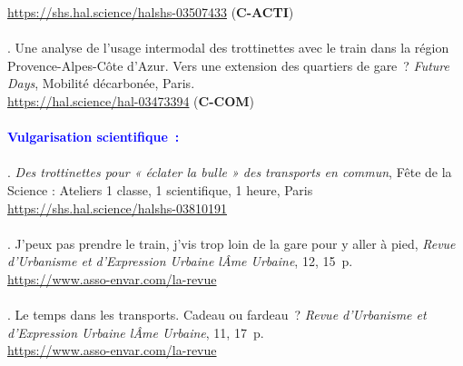 \begin{refsegment}
\begin{tcolorbox}[colback=white!5!white,
                      colframe=blue!75!blue,
                      title=Valorisation scientifique
                      \\
                      Chapitre~5]
{\footnotesize{\url{https://shs.hal.science/halshs-03507433}} (\textbf{C-ACTI})}
    \\\\
\small{\textcolor{blue}{\textcite{moinse_analyse_2021}}. Une analyse de l’usage intermodal des trottinettes avec le train dans la région Provence-Alpes-Côte d’Azur. Vers une extension des quartiers de gare~? \textsl{Future Days}, Mobilité décarbonée, Paris.
\\
\footnotesize{\url{https://hal.science/hal-03473394}} (\textbf{C-COM})}
    \\\\
\Large{\textcolor{blue}{\textbf{Vulgarisation scientifique~:}}}
    \\\\
\small{\textcolor{blue}{\textcite{moinse_trottinettes_2022}}. \textsl{Des trottinettes pour « éclater la bulle » des transports en commun}, Fête de la Science : Ateliers 1 classe, 1 scientifique, 1 heure, Paris 
\\
\footnotesize{\url{https://shs.hal.science/halshs-03810191}}}
    \\\\
\small{\textcolor{blue}{\textcite{moinse_jpeux_2022}}. J’peux pas prendre le train, j’vis trop loin de la gare pour y aller à pied, \textsl{Revue d'Urbanisme et d'Expression Urbaine lÂme Urbaine}, 12, 15~p.
\\
\footnotesize{\url{https://www.asso-envar.com/la-revue}}}
    \\\\
\small{\textcolor{blue}{\textcite{moinse_temps_2020}}. Le temps dans les transports. Cadeau ou fardeau~? \textsl{Revue d'Urbanisme et d'Expression Urbaine lÂme Urbaine}, 11, 17~p.
\\
\footnotesize{\url{https://www.asso-envar.com/la-revue}}}
    \end{tcolorbox}

    \newpage
    \begingroup
    \renewcommand{\bibfont}{\scriptsize}
\printbibliography[segment=\therefsegment, heading=subbibintoc, title={Sous-bibliographie du chapitre~5}, label=chap5:bibliographie]
    \endgroup
    \end{refsegment}